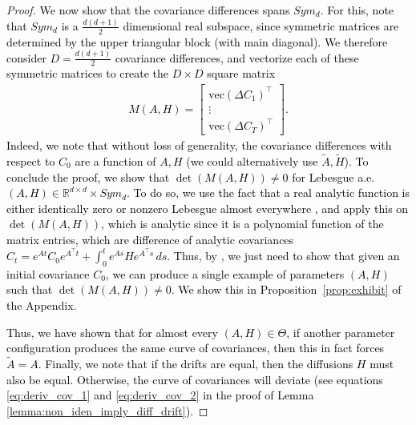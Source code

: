 \documentclass[twoside,11pt]{article}
\newcommand{\R} {\mathbb R}
\newcommand{\rv}[1]{\textcolor{black}{#1}}
\begin{document}
\begin{proof}
\rv{We now show that the covariance differences spans $Sym_d$. For this, note that $Sym_d$ is a $\frac{d(d+1)}{2}$ dimensional real subspace, since symmetric matrices are determined by the upper triangular block (with main diagonal). We therefore consider $D=\frac{d(d+1)}{2}$ covariance differences, and vectorize each of these symmetric matrices to create the $D \times D$ square matrix
\begin{align}
M(A,H) = \begin{bmatrix} \text{vec}(\Delta C_1)^\top \\ \vdots \\ \text{vec}(\Delta C_T)^\top
\end{bmatrix}.
\end{align}
Indeed, we note that without loss of generality, the covariance differences with respect to $C_0$ are a function of $A,H$ (we could alternatively use $\tilde{A}, \tilde{H}$). To conclude the proof, we show that $\det(M(A,H)) \neq 0$ for Lebesgue a.e. $(A,H) \in \R^{d \times d} \times Sym_d$. To do so, we use the fact that a real analytic function is either identically zero or nonzero Lebesgue almost everywhere \citep[Proposition 0]{mityagin2015zero}, and apply this on $\det(M(A,H))$, which is analytic since it is a polynomial function of the matrix entries, which are difference of analytic covariances $C_t = e^{At}C_0 e^{A^\top t} + \int_{0}^t e^{As}He^{A^\top s}\,ds$. Thus, by \citep[Proposition 0]{mityagin2015zero}, we just need to show that given an initial covariance $C_0$, we can produce a single example of parameters $(A,H)$ such that $\det(M(A,H)) \neq 0$. We show this in Proposition~\ref{prop:exhibit} of the Appendix.}

\rv{Thus, we have shown that for almost every $(A,H) \in \Theta$, if another parameter configuration produces the same curve of covariances, then this in fact forces $\tilde{A}=A$. Finally, we note that if the drifts are equal, then the diffusions $H$ must also be equal. Otherwise, the curve of covariances will deviate (see equations \eqref{eq:deriv_cov_1} and \eqref{eq:deriv_cov_2} in the proof of Lemma \ref{lemma:non_iden_imply_diff_drift}).}
\end{proof}


\end{document}
